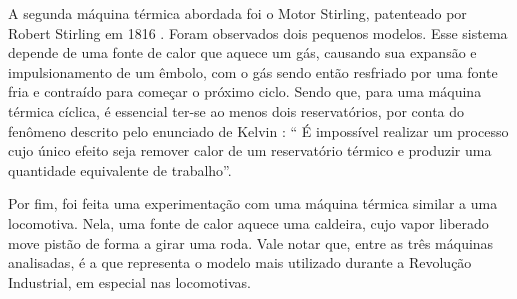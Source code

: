 A segunda máquina térmica abordada foi o Motor Stirling, patenteado por Robert Stirling em 1816 \cite{lopes2022motor}. Foram observados dois pequenos modelos. Esse sistema depende de uma fonte de calor que aquece um gás, causando sua expansão e impulsionamento de um êmbolo, com o gás sendo então resfriado por uma fonte fria e contraído para começar o próximo ciclo. Sendo que, para uma máquina térmica cíclica, é essencial ter-se ao menos dois reservatórios, por conta do fenômeno descrito pelo enunciado de Kelvin \cite{Nussenzveig_2014}: “ É impossível realizar um processo cujo único efeito seja remover calor de um reservatório térmico e produzir uma quantidade equivalente de trabalho”. 

Por fim, foi feita uma experimentação com uma máquina térmica similar a uma locomotiva. Nela, uma fonte de calor aquece uma caldeira, cujo vapor liberado move pistão de forma a girar uma roda. Vale notar que, entre as três máquinas analisadas, é a que representa o modelo mais utilizado durante a Revolução Industrial, em especial nas locomotivas.

